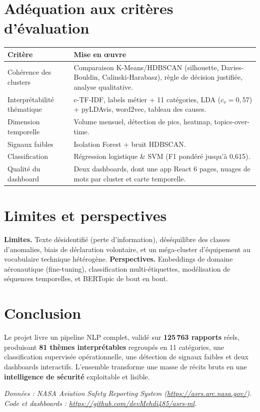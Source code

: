 \documentclass[11pt,a4paper]{article}
\begin{document}
\section{Adéquation aux critères d'évaluation}
\begin{table}[h]\centering\small
\renewcommand{\arraystretch}{1.25}
\begin{tabular}{p{3.4cm}p{10.5cm}}
\toprule
\textbf{Critère} & \textbf{Mise en œuvre} \\
\midrule
Cohérence des clusters & Comparaison K-Means/HDBSCAN (silhouette, Davies-Bouldin, Calinski-Harabasz), règle de décision justifiée, analyse qualitative. \\
Interprétabilité thématique & c-TF-IDF, labels métier + 11 catégories, LDA ($c_v=0{,}57$) + pyLDAvis, word2vec, tableau des causes. \\
Dimension temporelle & Volume mensuel, détection de pics, heatmap, topics-over-time. \\
Signaux faibles & Isolation Forest + bruit HDBSCAN. \\
Classification & Régression logistique \& SVM (F1 pondéré jusqu'à 0,615). \\
Qualité du dashboard & Deux dashboards, dont une app React 6 pages, nuages de mots par cluster et carte temporelle. \\
\bottomrule
\end{tabular}
\end{table}

\section{Limites et perspectives}
\textbf{Limites.} Texte désidentifié (perte d'information), déséquilibre des classes
d'anomalies, biais de déclaration volontaire, et un méga-cluster d'équipement
au vocabulaire technique hétérogène.
\textbf{Perspectives.} Embeddings de domaine aéronautique (fine-tuning),
classification multi-étiquettes, modélisation de séquences temporelles, et
BERTopic de bout en bout.

\section{Conclusion}
Le projet livre un pipeline NLP complet, validé sur \textbf{125\,763 rapports}
réels, produisant \textbf{81 thèmes interprétables} regroupés en 11 catégories,
une classification supervisée opérationnelle, une détection de signaux faibles et
deux dashboards interactifs. L'ensemble transforme une masse de récits bruts en une
\textbf{intelligence de sécurité} exploitable et lisible.

\vfill
\noindent\footnotesize\textit{Données : NASA Aviation Safety Reporting System
(\url{https://asrs.arc.nasa.gov/}). Code et dashboards :
\url{https://github.com/devMehdi485/asrs-ml}.}
\end{document}
